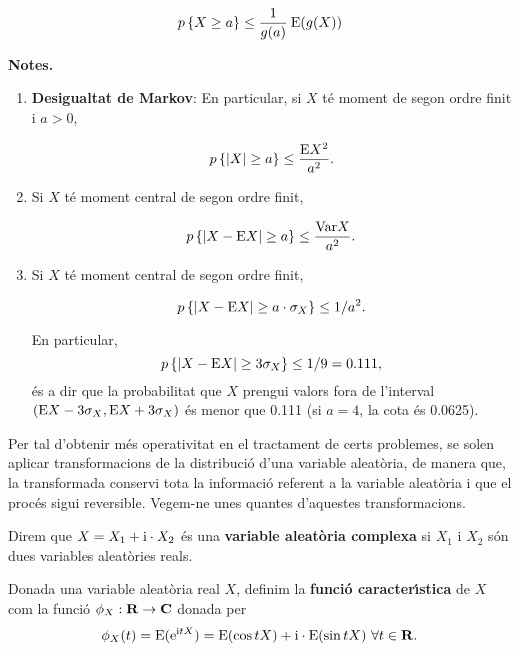 $$p\left\{X \geq a\right\} \leq {1 \over g(a)} \> {\rm E} (g(X))$$

{\bf Notes.}

\begin{enumerate}

\item {\bf Desigualtat de Markov}:
En particular, si $X$ t\'e moment de segon ordre finit i $a > 0$,

$$p\left\{|X| \geq a\right\} \leq {{\rm E}X^2 \over a^2}.$$

\item Si $X$ t\'e moment central de segon ordre finit,

$$p\left\{|X - {\rm E}X| \geq a\right\} \leq {{\rm Var}X \over a^2}.$$

\item Si $X$ t\'e moment central de segon ordre finit,

$$p\left\{|X - {\rm E}X| \geq a \cdot \sigma_X\right\} \leq 1/a^2.$$

En particular,
$$p\left\{|X - {\rm E}X| \geq 3 \sigma_X\right\} \leq 1/9 = 0.111,$$
\'es a dir que la probabilitat que $X$ prengui valors fora de l'interval
\newline $({\rm E} X - 3 \sigma_X, {\rm E} X + 3 \sigma_X)$ \'es menor que 0.111 (si $a =
4$, la
cota \'es 0.0625).

\end{enumerate}

Per tal d'obtenir m\'es operativitat en el tractament de certs problemes, se
solen aplicar transformacions de la distribuci\'o d'una variable aleat\`oria, de manera que,
la transformada conservi tota la informaci\'o referent a la variable aleat\`oria
i
que el proc\'es sigui reversible. Vegem-ne unes quantes d'aquestes
transformacions.


\begin{defin}
Direm que $X = X_1 + {\rm i} \cdot X_2$ \'es una {\bf variable aleat\`oria
complexa} si $X_1$ i $X_2$ s\'on
dues variables aleat\`ories reals. \end{defin}

\begin{defin}
Donada una variable aleat\`oria real $X$, definim la {\bf funci\'o
caracter\'{\i}stica}
de $X$ com la
funci\'o $\phi_X : {\bf R} \to {\bf C}$ donada per  $$\phi_X(t) ={\rm E}({\rm e}^{{\rm i}tX})
={\rm E}(\cos tX) + {\rm i} \cdot
{\rm E}(\sin tX) \ \forall t
\in {\bf R}.$$
\end{defin}

